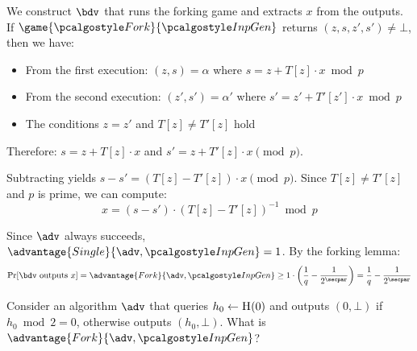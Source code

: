 \ifsolutions
\begin{mysolution}
  We construct $\bdv$ that runs the forking game and extracts $x$ from the outputs. If $\game{\algo{Fork}}{\algo{InpGen}}$ returns $(z, s, z', s') \neq \bot$, then we have:
  \begin{itemize}
    \item From the first execution: $(z, s) = \alpha$ where $s = z + T[z] \cdot x \bmod p$
    \item From the second execution: $(z', s') = \alpha'$ where $s' = z' + T'[z'] \cdot x \bmod p$
    \item The conditions $z = z'$ and $T[z] \neq T'[z]$ hold
  \end{itemize}
  
  Therefore: $s = z + T[z] \cdot x$ and $s' = z + T'[z] \cdot x \pmod{p}$.
  
  Subtracting yields $s - s' = (T[z] - T'[z]) \cdot x \pmod{p}$. Since $T[z] \neq T'[z]$ and $p$ is prime, we can compute:
  \[
  x = (s - s') \cdot (T[z] - T'[z])^{-1} \bmod p
  \]
  
  Since $\adv$ always succeeds, $\advantage{Single}{\adv, \algo{InpGen}} = 1$. By the forking lemma:
  \[
  \Pr[\bdv \text{ outputs } x] = \advantage{Fork}{\adv, \algo{InpGen}} \geq 1 \cdot \left(\frac{1}{q} - \frac{1}{2^\secpar}\right) = \frac{1}{q} - \frac{1}{2^\secpar}
  \]
\end{mysolution}
\fi

\begin{exercise}
  Consider an algorithm $\adv$ that queries $h_0 \gets {\normalfont\textsc{H}}(0)$ and outputs $(0, \bot)$ if $h_0 \bmod 2 = 0$, otherwise outputs $(h_0, \bot)$. What is $\advantage{Fork}{\adv, \algo{InpGen}}$?
\end{exercise}

